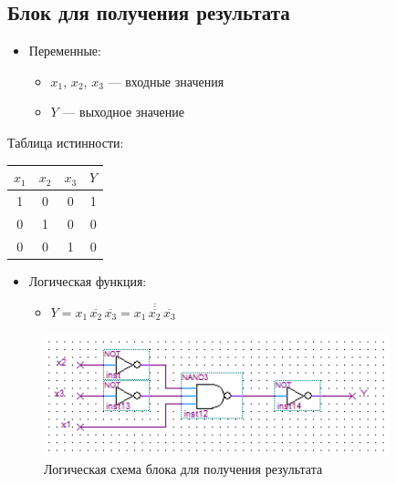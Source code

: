 \documentclass[utf8x, 12pt]{G7-32}
\begin{document}
\newpage

\subsection{Блок для получения результата}

\begin{itemize}
	\item Переменные:
		\begin{itemize}
			\item $x_1$, $x_2$, $x_3$  --- входные значения
			\item $Y$ --- выходное значение
		\end{itemize}			
\end{itemize}

\bigskip
Таблица истинности:

\begin{table}[hhh!]
	\begin{center}
		\begin{tabular}{|ccc|c|}
		\hline
		$x_1$ & $x_2$ & $x_3$ & $Y$\\
		\hline
		1 & 0 & 0 &		1 \\
		0 & 1 & 0 &		0 \\
		0 & 0 & 1 &		0 \\
		\hline
		\end{tabular}
	\end{center}	
\end{table}

\begin{itemize}
	\item Логическая функция:
	\begin{itemize}
		\item $Y = x_1 \, \overline{x_2} \, \overline{x_3} = \overline{\overline{x_1 \, \overline{x_2} \, \overline{x_3}}}$
	\end{itemize}
\end{itemize}


\begin{figure}[hhh!]
\begin{center}
\includegraphics[width=10cm]{img/RES}
\end{center}
\vspace{-5mm}\caption{Логическая схема блока для получения результата}
\end{figure}
\end{document}
